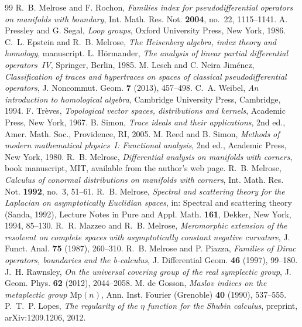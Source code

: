 \begin{thebibliography}{99}
 R.~B. Melrose and F. Rochon, \emph{Families index for pseudodifferential operators on manifolds with boundary}, Int. Math. Res. Not. \textbf{2004}, no.~22, 1115--1141.
 A. Pressley and G. Segal, \emph{Loop groups}, Oxford University Press, New York, 1986.
 C.~L. Epstein and R.~B. Melrose, \emph{The Heisenberg algebra, index theory and homology}, manuscript.
 L. H\"ormander, \emph{The analysis of linear partial differential operators~IV}, Springer, Berlin, 1985.
 M. Lesch and C. Neira Jim\'enez, \emph{Classification of traces and hypertraces on spaces of classical pseudodifferential operators}, J. Noncommut. Geom. \textbf{7} (2013), 457--498.
 C.~A. Weibel, \emph{An introduction to homological algebra}, Cambridge University Press, Cambridge, 1994.
 F. Tr\`eves, \emph{Topological vector spaces, distributions and kernels}, Academic Press, New York, 1967.
 B. Simon, \emph{Trace ideals and their applications}, 2nd ed., Amer. Math. Soc., Providence, RI, 2005.
 M. Reed and B. Simon, \emph{Methods of modern mathematical physics~I: Functional analysis}, 2nd ed., Academic Press, New York, 1980.
 R.~B. Melrose, \emph{Differential analysis on manifolds with corners}, book manuscript, MIT, available from the author's web page.
 R.~B. Melrose, \emph{Calculus of conormal distributions on manifolds with corners}, Int. Math. Res. Not. \textbf{1992}, no.~3, 51--61.
 R.~B. Melrose, \emph{Spectral and scattering theory for the Laplacian on asymptotically Euclidian spaces}, in: Spectral and scattering theory (Sanda, 1992), Lecture Notes in Pure and Appl. Math. \textbf{161}, Dekker, New York, 1994, 85--130.
 R.~R. Mazzeo and R.~B. Melrose, \emph{Meromorphic extension of the resolvent on complete spaces with asymptotically constant negative curvature}, J. Funct. Anal. \textbf{75} (1987), 260--310.
 R.~B. Melrose and P. Piazza, \emph{Families of Dirac operators, boundaries and the b-calculus}, J. Differential Geom. \textbf{46} (1997), 99--180.
 J.~H. Rawnsley, \emph{On the universal covering group of the real symplectic group}, J. Geom. Phys. \textbf{62} (2012), 2044--2058.
 M. de Gosson, \emph{Maslov indices on the metaplectic group $\mathrm{Mp}(n)$}, Ann. Inst. Fourier (Grenoble) \textbf{40} (1990), 537--555.
 P.~T.~P. Lopes, \emph{The regularity of the $\eta$ function for the Shubin calculus}, preprint, arXiv:1209.1206, 2012.

\end{thebibliography}
